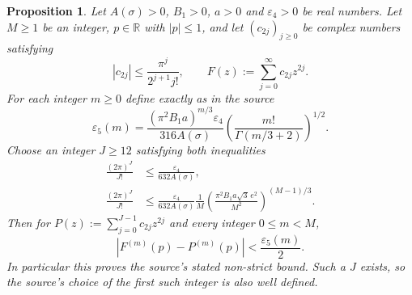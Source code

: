 \documentclass[11pt]{article}
\newtheorem{proposition}[theorem]{Proposition}
\newcommand{\R}{\mathbb R}
\newcommand{\eps}{\varepsilon}
\begin{document}
\begin{proposition}\label{prop:taylor}
Let $A(\sigma)>0$, $B_1>0$, $a>0$ and $\eps_4>0$ be real numbers.
Let $M\ge1$ be an integer, $p\in\R$ with $|p|\le1$, and let
$(c_{2j})_{j\ge0}$ be complex numbers satisfying
\begin{equation}\label{eq:coefficient-bound}
|c_{2j}|\le\frac{\pi^j}{2^{j+1}j!},\qquad
F(z):=\sum_{j=0}^\infty c_{2j}z^{2j}.
\end{equation}
For each integer $m\ge0$ define exactly as in the source
\begin{equation}\label{eq:epsilon5}
\eps_5(m)=\frac{(\pi^2B_1a)^{m/3}\eps_4}{316 A(\sigma)}
\left(\frac{m!}{\Gamma(m/3+2)}\right)^{1/2}.
\end{equation}
Choose an integer $J\ge12$ satisfying both inequalities
\begin{align}
\frac{(2\pi)^J}{J!}&\le\frac{\eps_4}{632 A(\sigma)},\label{eq:Jfirst}\\
\frac{(2\pi)^J}{J!}&\le\frac{\eps_4}{632 A(\sigma)}\frac1M
\left(\frac{\pi^2 B_1a\sqrt3\,e^2}{M^2}\right)^{(M-1)/3}.
\label{eq:Jsecond}
\end{align}
Then for $P(z):=\sum_{j=0}^{J-1}c_{2j}z^{2j}$ and every integer
$0\le m<M$,
\begin{equation}\label{eq:taylor-conclusion}
|F^{(m)}(p)-P^{(m)}(p)|<\frac{\eps_5(m)}2.
\end{equation}
In particular this proves the source's stated non-strict bound.
Such a $J$ exists, so the source's choice of the first such integer
is also well defined.
\end{proposition}
\end{document}
